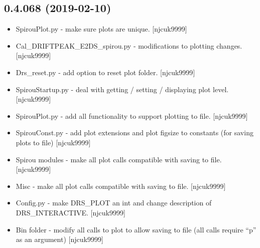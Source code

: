 \documentclass[a4paper,10pt,english]{report}
\begin{document}
\subsection{0.4.068 (2019-02-10)}
\label{\detokenize{misc/changelog:id188}}\begin{itemize}
\item {} 
SpirouPlot.py - make sure plots are unique. {[}njcuk9999{]}

\item {} 
Cal\_DRIFTPEAK\_E2DS\_spirou.py - modifications to plotting changes.
{[}njcuk9999{]}

\item {} 
Drs\_reset.py - add option to reset plot folder. {[}njcuk9999{]}

\item {} 
SpirouStartup.py - deal with getting / setting / displaying plot
level. {[}njcuk9999{]}

\item {} 
SpirouPlot.py - add all functionality to support plotting to file.
{[}njcuk9999{]}

\item {} 
SpirouConst.py - add plot extensions and plot figsize to constants
(for saving plots to file) {[}njcuk9999{]}

\item {} 
Spirou modules - make all plot calls compatible with saving to file.
{[}njcuk9999{]}

\item {} 
Misc - make all plot calls compatible with saving to file. {[}njcuk9999{]}

\item {} 
Config.py - make DRS\_PLOT an int and change description of
DRS\_INTERACTIVE. {[}njcuk9999{]}

\item {} 
Bin folder - modify all calls to plot to allow saving to file (all
calls require “p” as an argument) {[}njcuk9999{]}

\end{itemize}
\end{document}
